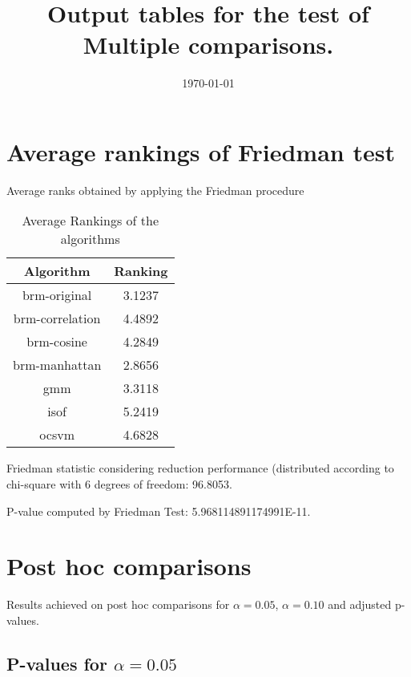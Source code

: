 \documentclass[a4paper,10pt]{article}
\title{Output tables for the test of Multiple comparisons.}
\author{}
\date{\today}
\begin{document}
\begin{landscape}
\pagestyle{empty}
\maketitle
\thispagestyle{empty}
\section{Average rankings of Friedman test}



Average ranks obtained by applying the Friedman procedure

\begin{table}[!htp]
\centering
\begin{tabular}{|c|c|}\hline
Algorithm&Ranking\\\hline
brm-original & 3.1237\\
brm-correlation & 4.4892\\
brm-cosine & 4.2849\\
brm-manhattan & 2.8656\\
gmm & 3.3118\\
isof & 5.2419\\
ocsvm & 4.6828\\
\hline
\end{tabular}
\caption{Average Rankings of the algorithms}
\end{table}

Friedman statistic considering reduction performance (distributed according to chi-square with 6 degrees of freedom: 96.8053.

P-value computed by Friedman Test: 5.968114891174991E-11.\newline



\pagebreak

\section{Post hoc comparisons}

Results achieved on post hoc comparisons for $\alpha = 0.05$, $\alpha = 0.10$ and adjusted p-values.

\subsection{P-values for $\alpha=0.05$}


\end{landscape}
\end{document}

